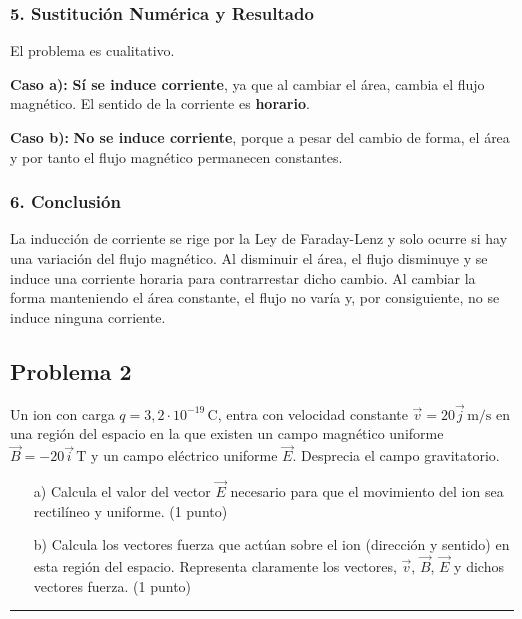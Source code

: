 \subsubsection*{5. Sustitución Numérica y Resultado}
El problema es cualitativo.
\begin{cajaresultado}
    \textbf{Caso a):} \textbf{Sí se induce corriente}, ya que al cambiar el área, cambia el flujo magnético. El sentido de la corriente es \textbf{horario}.
\end{cajaresultado}
\begin{cajaresultado}
    \textbf{Caso b):} \textbf{No se induce corriente}, porque a pesar del cambio de forma, el área y por tanto el flujo magnético permanecen constantes.
\end{cajaresultado}

\subsubsection*{6. Conclusión}
\begin{cajaconclusion}
La inducción de corriente se rige por la Ley de Faraday-Lenz y solo ocurre si hay una variación del flujo magnético. Al disminuir el área, el flujo disminuye y se induce una corriente horaria para contrarrestar dicho cambio. Al cambiar la forma manteniendo el área constante, el flujo no varía y, por consiguiente, no se induce ninguna corriente.
\end{cajaconclusion}

\newpage
\subsection{Problema 2}
\label{subsec:P2_2020_jul_ext_b}

\begin{cajaenunciado}
Un ion con carga $q=3,2\cdot10^{-19}\,\text{C}$, entra con velocidad constante $\vec{v}=20\vec{j}\,\text{m/s}$ en una región del espacio en la que existen un campo magnético uniforme $\vec{B}=-20\vec{i}\,\text{T}$ y un campo eléctrico uniforme $\vec{E}$. Desprecia el campo gravitatorio.
\begin{enumerate}
    \item[a)] Calcula el valor del vector $\vec{E}$ necesario para que el movimiento del ion sea rectilíneo y uniforme. (1 punto)
    \item[b)] Calcula los vectores fuerza que actúan sobre el ion (dirección y sentido) en esta región del espacio. Representa claramente los vectores, $\vec{v}$, $\vec{B}$, $\vec{E}$ y dichos vectores fuerza. (1 punto)
\end{enumerate}
\end{cajaenunciado}
\hrule

